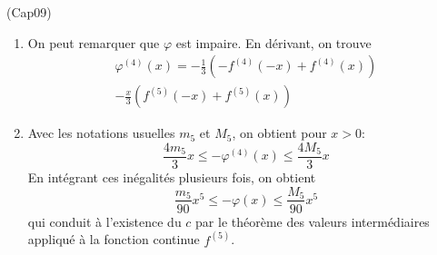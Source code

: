 \begin{tiny}(Cap09)\end{tiny} 
\begin{enumerate}
 \item On peut remarquer que $\varphi$ est impaire. En dérivant, on trouve
\begin{multline*}
 \varphi^{(4)}(x)
= -\frac{1}{3}\left(-f^{(4)}(-x)+f^{(4)}(x) \right) \\
-\frac{x}{3} \left( f^{(5)}(-x)+f^{(5)}(x) \right)
\end{multline*}
\item Avec les notations usuelles $m_5$ et $M_5$, on obtient pour $x>0$:
\begin{displaymath}
 \frac{4m_5}{3}x\leq -\varphi^{(4)}(x) \leq \frac{4M_5}{3}x
\end{displaymath}
En intégrant ces inégalités plusieurs fois, on obtient
\begin{displaymath}
 \frac{m_5}{90}x^5\leq -\varphi(x) \leq \frac{M_5}{90}x^5
\end{displaymath}
qui conduit à l'existence du $c$ par le théorème des valeurs intermédiaires appliqué à la fonction continue $f^{(5)}$.
\end{enumerate}
